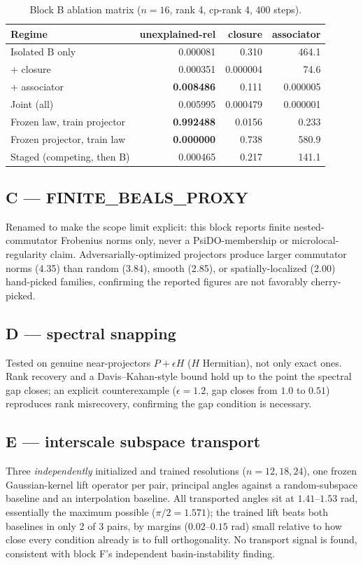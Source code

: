 \documentclass[11pt]{amsart}
\begin{document}
\begin{table}[h]
\centering
\caption{Block B ablation matrix ($n=16$, rank 4, cp-rank 4, 400 steps).}
\label{tab:ablation}
\begin{tabular}{lrrr}
\toprule
Regime & unexplained-rel & closure & associator \\
\midrule
Isolated B only & 0.000081 & 0.310 & 464.1 \\
+ closure & 0.000351 & 0.000004 & 74.6 \\
+ associator & \textbf{0.008486} & 0.111 & 0.000005 \\
Joint (all) & 0.005995 & 0.000479 & 0.000001 \\
Frozen law, train projector & \textbf{0.992488} & 0.0156 & 0.233 \\
Frozen projector, train law & \textbf{0.000000} & 0.738 & 580.9 \\
Staged (competing, then B) & 0.000465 & 0.217 & 141.1 \\
\bottomrule
\end{tabular}
\end{table}

\subsection{C --- FINITE\_BEALS\_PROXY}
Renamed to make the scope limit explicit: this block reports finite
nested-commutator Frobenius norms only, never a PsiDO-membership or
microlocal-regularity claim. Adversarially-optimized projectors produce
larger commutator norms (4.35) than random (3.84), smooth (2.85), or
spatially-localized (2.00) hand-picked families, confirming the reported
figures are not favorably cherry-picked.

\subsection{D --- spectral snapping}
Tested on genuine near-projectors $P+\epsilon H$ ($H$ Hermitian), not only
exact ones. Rank recovery and a Davis--Kahan-style bound hold up to the
point the spectral gap closes; an explicit counterexample
($\epsilon=1.2$, gap closes from $1.0$ to $0.51$) reproduces rank
misrecovery, confirming the gap condition is necessary.

\subsection{E --- interscale subspace transport}
Three \emph{independently} initialized and trained resolutions ($n=12,
18, 24$), one frozen Gaussian-kernel lift operator per pair, principal
angles against a random-subspace baseline and an interpolation baseline.
All transported angles sit at $1.41$--$1.53$ rad, essentially the maximum
possible ($\pi/2 = 1.571$); the trained lift beats both baselines in only
2 of 3 pairs, by margins ($0.02$--$0.15$ rad) small relative to how close
every condition already is to full orthogonality. No transport signal is
found, consistent with block F's independent basin-instability finding.
\end{document}
